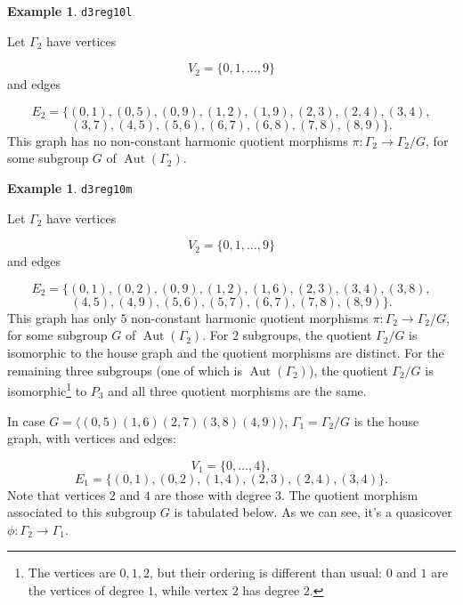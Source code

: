 \documentclass[12pt,letterpaper]{article}
\theoremstyle{definition}
\newtheorem{example}[theorem]{Example}
\DeclareMathOperator{\Aut}{Aut}
\begin{document}
\begin{example}%
\label{example:d3reg10l}
  {\tt d3reg10l}\newline
{\rm  
Let $\Gamma_2$ have vertices

\[
V_2=\{0,1,\dots,9\}
\]
and edges

\[
E_2 = \{
(0, 1), (0, 5), (0, 9), (1, 2), (1, 9), (2, 3), (2, 4), (3, 4),
\]
\[
(3, 7), (4, 5), (5, 6), (6, 7), (6, 8), (7, 8), (8, 9)
\}.
\]
This graph has no non-constant harmonic quotient
morphisms $\pi: \Gamma_2\to \Gamma_2/G$, for some subgroup
$G$ of $\Aut(\Gamma_2)$.

}
\end{example}



\begin{example}%
\label{example:d3reg10m}
  {\tt d3reg10m}\newline
{\rm  
Let $\Gamma_2$ have vertices

\[
V_2=\{0,1,\dots,9\}
\]
and edges

\[
E_2 = \{
(0, 1), (0, 2), (0, 9), (1, 2), (1, 6), (2, 3), (3, 4), (3, 8), 
\]
\[
(4, 5), (4, 9), (5, 6), (5, 7), (6, 7), (7, 8), (8, 9)
\}.
\]
This graph has only $5$ non-constant harmonic quotient
morphisms $\pi: \Gamma_2\to \Gamma_2/G$, for some subgroup
$G$ of $\Aut(\Gamma_2)$.
For $2$ subgroups, the quotient $ \Gamma_2/G$ is isomorphic to the house graph
and the quotient morphisms are distinct. For the remaining three subgroups (one of which is $\Aut(\Gamma_2)$),
the quotient $ \Gamma_2/G$ is
isomorphic\footnote{The vertices are $0,1,2$, but their ordering is different than usual:
  $0$ and $1$ are the vertices of degree $1$, while vertex $2$ has degree $2$.}
  to $P_3$ and all three quotient morphisms are the same.

In case $G = \langle (0,5)(1,6)(2,7)(3,8)(4,9) \rangle$,
$\Gamma_1 =  \Gamma_2/G$ is the house graph, with vertices and edges:

\[
V_1 = \{0, \dots, 4\},
\]
\[
E_1 = \{(0, 1), (0, 2), (1, 4), (2, 3), (2, 4), (3, 4)\}.
\]
Note that vertices $2$ and $4$ are those with degree $3$.
The quotient morphism 
associated to this subgroup $G$ is tabulated below. As we can see, it's a quasicover
$\phi:\Gamma_2\to \Gamma_1$.

}
\end{example}
\end{document}

